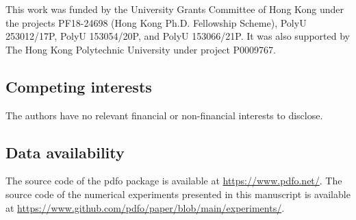 \documentclass[
    smallextended,  %
    final,          %
]{svjour3}
\begin{document}
This work was funded by the University Grants Committee of Hong Kong under the
projects PF18-24698 (Hong Kong Ph.D. Fellowship Scheme), PolyU 253012/17P, PolyU 153054/20P,
and PolyU 153066/21P.
It was also supported by The Hong Kong Polytechnic University under project P0009767.

\subsection{Competing interests}

The authors have no relevant financial or non-financial interests to disclose.

\subsection{Data availability}

The source code of the \gls{pdfo} package is available at \mbox{\url{https://www.pdfo.net/}}.
The source code of the numerical experiments presented in this manuscript is available at
\mbox{\url{https://www.github.com/pdfo/paper/blob/main/experiments/}}.



\end{document}
